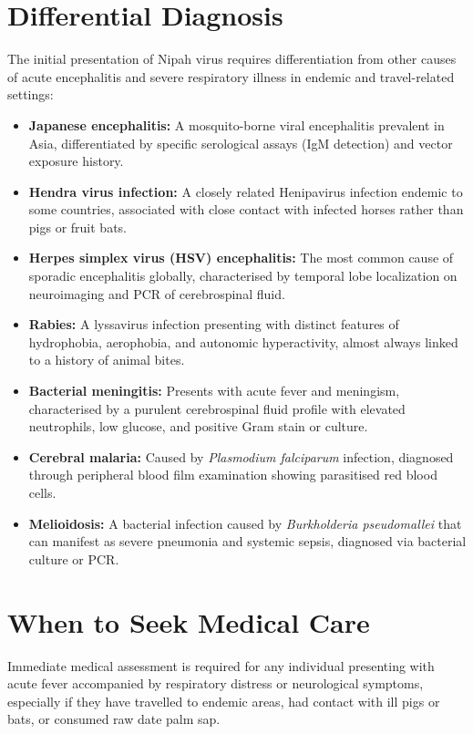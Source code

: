 \section*{Differential Diagnosis}
The initial presentation of Nipah virus requires differentiation from other causes of acute encephalitis and severe respiratory illness in endemic and travel-related settings:
\begin{itemize}
    \item \textbf{Japanese encephalitis:} A mosquito-borne viral encephalitis prevalent in Asia, differentiated by specific serological assays (IgM detection) and vector exposure history.
    \item \textbf{Hendra virus infection:} A closely related Henipavirus infection endemic to some countries, associated with close contact with infected horses rather than pigs or fruit bats.
    \item \textbf{Herpes simplex virus (HSV) encephalitis:} The most common cause of sporadic encephalitis globally, characterised by temporal lobe localization on neuroimaging and PCR of cerebrospinal fluid.
    \item \textbf{Rabies:} A lyssavirus infection presenting with distinct features of hydrophobia, aerophobia, and autonomic hyperactivity, almost always linked to a history of animal bites.
    \item \textbf{Bacterial meningitis:} Presents with acute fever and meningism, characterised by a purulent cerebrospinal fluid profile with elevated neutrophils, low glucose, and positive Gram stain or culture.
    \item \textbf{Cerebral malaria:} Caused by \textit{Plasmodium falciparum} infection, diagnosed through peripheral blood film examination showing parasitised red blood cells.
    \item \textbf{Melioidosis:} A bacterial infection caused by \textit{Burkholderia pseudomallei} that can manifest as severe pneumonia and systemic sepsis, diagnosed via bacterial culture or PCR.
\end{itemize}

\section*{When to Seek Medical Care}
Immediate medical assessment is required for any individual presenting with acute fever accompanied by respiratory distress or neurological symptoms, especially if they have travelled to endemic areas, had contact with ill pigs or bats, or consumed raw date palm sap.


